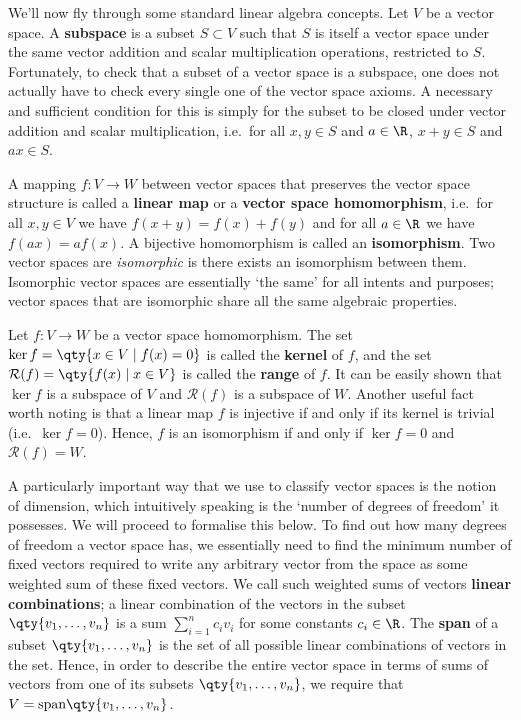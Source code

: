 \vspace{3mm}

We'll now fly through some standard linear algebra concepts. Let \( V \) be a vector space. A \textbf{subspace} is a subset \( S\subset V \) such that \( S \) is itself a vector space under the same vector addition and scalar multiplication operations, restricted to \( S \). Fortunately, to check that a subset of a vector space is a subspace, one does not actually have to check every single one of the vector space axioms. A necessary and sufficient condition for this is simply for the subset to be closed under vector addition and scalar multiplication, i.e.\ for all \( x,y\in S \) and \( a\in\R \), \( x+y\in S \) and \( ax\in S \).

\vspace{3mm}

A mapping \( f:V\to W \) between vector spaces that preserves the vector space structure is called a \textbf{linear map} or a \textbf{vector space homomorphism}, i.e.\ for all \( x,y\in V \) we have \( f(x+y)=f(x)+f(y) \) and for all \( a\in\R \) we have \( f(ax)=af(x) \). A bijective homomorphism is called an \textbf{isomorphism}. Two vector spaces are \emph{isomorphic} is there exists an isomorphism between them. Isomorphic vector spaces are essentially `the same' for all intents and purposes; vector spaces that are isomorphic share all the same algebraic properties.

\vspace{3mm}

Let \( f:V\to W \) be a vector space homomorphism. The set \( \ker f=\qty{x\in V\mid f(x)=0} \) is called the \textbf{kernel} of \( f \), and the set \( \mathcal{R}(f)=\qty{f(x)\mid x\in V} \) is called the \textbf{range} of \( f \). It can be easily shown that \( \ker f \) is a subspace of \( V \) and \( \mathcal{R}(f) \) is a subspace of \( W \). Another useful fact worth noting is that a linear map \( f \) is injective if and only if its kernel is trivial (i.e.\ \( \ker f=\qty{0} \)). Hence, \( f \) is an isomorphism if and only if \( \ker f=\qty{0} \) and \( \mathcal{R}(f)=W \).

\vspace{3mm}

A particularly important way that we use to classify vector spaces is the notion of dimension, which intuitively speaking is the `number of degrees of freedom' it possesses. We will proceed to formalise this below. To find out how many degrees of freedom a vector space has, we essentially need to find the minimum number of fixed vectors required to write any arbitrary vector from the space as some weighted sum of these fixed vectors. We call such weighted sums of vectors \textbf{linear combinations}; a linear combination of the vectors in the subset \( \qty{v_1,\dots,v_n} \) is a sum \( \sum_{i=1}^nc_iv_i \) for some constants \( c_i\in\R \). The \textbf{span} of a subset \( \qty{v_1,\dots,v_n} \) is the set of all possible linear combinations of vectors in the set. Hence, in order to describe the entire vector space in terms of sums of vectors from one of its subsets \( \qty{v_1,\dots,v_n} \), we require that \( V=\text{span}\qty{v_1,\dots,v_n} \).

